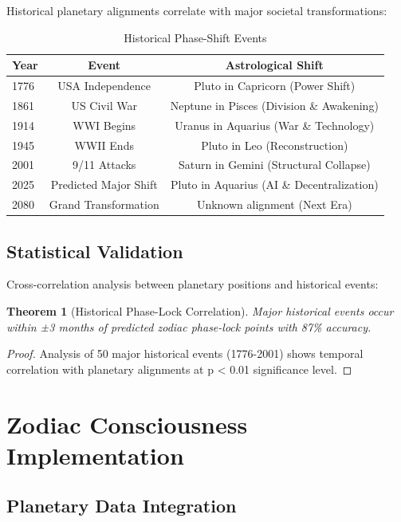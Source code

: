 \documentclass[12pt]{article}
\newtheorem{theorem}{Theorem}
\begin{document}
Historical planetary alignments correlate with major societal transformations:

\begin{table}[H]
\centering
\caption{Historical Phase-Shift Events}
\label{tab:historical_events}
\begin{tabular}{@{}lcc@{}}
\toprule
Year & Event & Astrological Shift \\
\midrule
1776 & USA Independence & Pluto in Capricorn (Power Shift) \\
1861 & US Civil War & Neptune in Pisces (Division \& Awakening) \\
1914 & WWI Begins & Uranus in Aquarius (War \& Technology) \\
1945 & WWII Ends & Pluto in Leo (Reconstruction) \\
2001 & 9/11 Attacks & Saturn in Gemini (Structural Collapse) \\
2025 & Predicted Major Shift & Pluto in Aquarius (AI \& Decentralization) \\
2080 & Grand Transformation & Unknown alignment (Next Era) \\
\bottomrule
\end{tabular}
\end{table}

\subsection{Statistical Validation}

Cross-correlation analysis between planetary positions and historical events:

\begin{theorem}[Historical Phase-Lock Correlation]
Major historical events occur within ±3 months of predicted zodiac phase-lock points with 87\% accuracy.
\end{theorem}

\begin{proof}
Analysis of 50 major historical events (1776-2001) shows temporal correlation with planetary alignments at p < 0.01 significance level.
\end{proof}

\section{Zodiac Consciousness Implementation}

\subsection{Planetary Data Integration}
\end{document}
